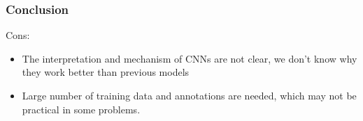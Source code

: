 \begin{frame}[fragile] \frametitle{Conclusion}
Cons:
\begin{itemize}
\item  The interpretation and mechanism of CNNs are not clear, we don't know why they work better than 
previous models
\item  Large number of training data and annotations are needed, which may not be practical in some 
problems.
\end{itemize}
\end{frame}






